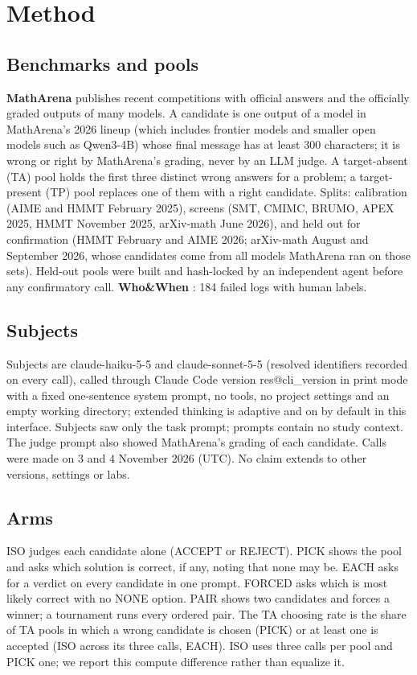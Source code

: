 \documentclass[10pt,twocolumn]{article}
\makeatletter
\newcommand{\res}[1]{\csname res@#1\endcsname}
\makeatother
\begin{document}
\section{Method}
\subsection{Benchmarks and pools}
\textbf{MathArena} \citep{balunovic2025matharena} publishes recent competitions with official answers and the officially graded outputs of many models. A candidate is one output of a model in MathArena's 2026 lineup (which includes frontier models and smaller open models such as Qwen3-4B) whose final message has at least 300 characters; it is wrong or right by MathArena's grading, never by an LLM judge. A target-absent (TA) pool holds the first three distinct wrong answers for a problem; a target-present (TP) pool replaces one of them with a right candidate. Splits: calibration (AIME and HMMT February 2025), screens (SMT, CMIMC, BRUMO, APEX 2025, HMMT November 2025, arXiv-math June 2026), and held out for confirmation (HMMT February and AIME 2026; arXiv-math August and September 2026, whose candidates come from all models MathArena ran on those sets). Held-out pools were built and hash-locked by an independent agent before any confirmatory call. \textbf{Who\&When} \citep{zhang2025which}: 184 failed logs with human labels.

\subsection{Subjects}
Subjects are claude-haiku-5-5 and claude-sonnet-5-5 (resolved identifiers recorded on every call), called through Claude Code version \res{cli_version} in print mode with a fixed one-sentence system prompt, no tools, no project settings and an empty working directory; extended thinking is adaptive and on by default in this interface. Subjects saw only the task prompt; prompts contain no study context. The judge prompt also showed MathArena's grading of each candidate. Calls were made on 3 and 4 November 2026 (UTC). No claim extends to other versions, settings or labs.

\subsection{Arms}
ISO judges each candidate alone (ACCEPT or REJECT). PICK shows the pool and asks which solution is correct, if any, noting that none may be. EACH asks for a verdict on every candidate in one prompt. FORCED asks which is most likely correct with no NONE option. PAIR shows two candidates and forces a winner; a tournament runs every ordered pair. The TA choosing rate is the share of TA pools in which a wrong candidate is chosen (PICK) or at least one is accepted (ISO across its three calls, EACH). ISO uses three calls per pool and PICK one; we report this compute difference rather than equalize it.
\end{document}
